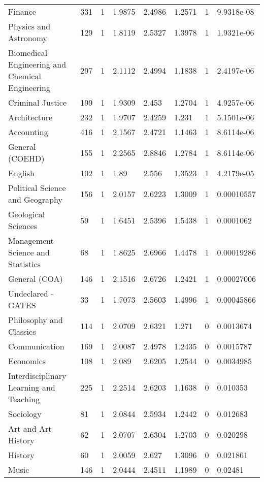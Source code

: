\begin{sidewaystable}
{\begin{longtable}{llllllll}
	Finance & 331 & 1 & 1.9875 & 2.4986 & 1.2571 & 1 & \color{red}9.9318e-08 \\ 
	Physics and Astronomy & 129 & 1 & 1.8119 & 2.5327 & 1.3978 & 1 & \color{red}1.9321e-06 \\ 
	Biomedical Engineering and Chemical Engineering & 297 & 1 & 2.1112 & 2.4994 & 1.1838 & 1 & \color{red}2.4197e-06 \\ 
	Criminal Justice & 199 & 1 & 1.9309 & 2.453 & 1.2704 & 1 & \color{red}4.9257e-06 \\ 
	Architecture & 232 & 1 & 1.9707 & 2.4259 & 1.231 & 1 & \color{red}5.1501e-06 \\ 
	Accounting & 416 & 1 & 2.1567 & 2.4721 & 1.1463 & 1 & \color{red}8.6114e-06 \\ 
	General (COEHD) & 155 & 1 & 2.2565 & 2.8846 & 1.2784 & 1 & \color{red}8.6114e-06 \\ 
	English & 102 & 1 & 1.89 & 2.556 & 1.3523 & 1 & \color{red}4.2179e-05 \\ 
	Political Science and Geography & 156 & 1 & 2.0157 & 2.6223 & 1.3009 & 1 & \color{red}0.00010557 \\ 
	Geological Sciences & 59 & 1 & 1.6451 & 2.5396 & 1.5438 & 1 & \color{red}0.0001062 \\ 
	Management Science and Statistics & 68 & 1 & 1.8625 & 2.6966 & 1.4478 & 1 & \color{red}0.00019286 \\ 
	General (COA) & 146 & 1 & 2.1516 & 2.6726 & 1.2421 & 1 & \color{red}0.00027006 \\ 
	Undeclared - GATES & 33 & 1 & 1.7073 & 2.5603 & 1.4996 & 1 & \color{red}0.00045866 \\ 
	Philosophy and Classics & 114 & 1 & 2.0709 & 2.6321 & 1.271 & 0 & \color{red}0.0013674 \\ 
	Communication & 169 & 1 & 2.0087 & 2.4978 & 1.2435 & 0 & \color{red}0.0015787 \\ 
	Economics & 108 & 1 & 2.089 & 2.6205 & 1.2544 & 0 & \color{red}0.0034985 \\ 
	Interdisciplinary Learning and Teaching & 225 & 1 & 2.2514 & 2.6203 & 1.1638 & 0 & \color{red}0.010353 \\ 
	Sociology & 81 & 1 & 2.0844 & 2.5934 & 1.2442 & 0 & \color{red}0.012683 \\ 
	Art and Art History & 62 & 1 & 2.0707 & 2.6304 & 1.2703 & 0 & \color{red}0.020298 \\ 
	History & 60 & 1 & 2.0059 & 2.627 & 1.3096 & 0 & \color{red}0.021861 \\ 
	Music & 146 & 1 & 2.0444 & 2.4511 & 1.1989 & 0 & \color{red}0.02481 \\ 

\end{longtable}}
\end{sidewaystable}
